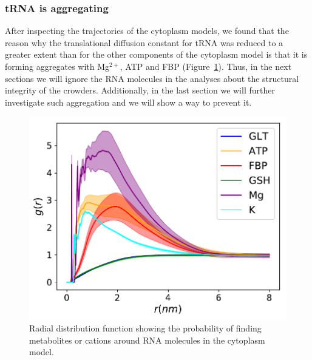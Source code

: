 \documentclass[journal=jacsat,manuscript=article]{achemso}
\begin{document}










\subsubsection{tRNA is aggregating}
After inspecting the trajectories of the cytoplasm models, we found that the reason why the translational diffusion constant for tRNA was reduced to a greater extent than for the other components of the cytoplasm model is that it is forming aggregates with Mg$^{2+}$, ATP and FBP (Figure~\ref{fig:tRNA_aggregation}). Thus, in the next sections we will ignore the RNA molecules in the analyses about the structural integrity of the crowders. Additionally, in the last section we will further investigate such aggregation and we will show a way to prevent it.

\begin{figure}[H]
\includegraphics[scale=0.5]{rdf_RNA_metabolites.pdf}
\caption{Radial distribution function showing the probability of finding metabolites or cations around RNA molecules in the cytoplasm model.}
\label{fig:tRNA_aggregation}
\end{figure}
\end{document}
